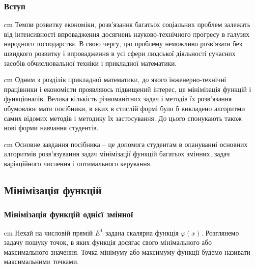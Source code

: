 \documentclass[12pt,a4paper]{article}
\begin{document}
\begin{center}
\section*{Вступ}
\end{center}
\begin{flushleft}
\parbox{14,5 cm}{ cm  Темпи розвитку економіки, розв’язання багатьох соціальних проблем залежать від інтенсивності впровадження досягнень науково-технічного прогресу в галузях народного господарства. В свою чергу, цю проблему неможливо розв’язати без швидкого розвитку і впровадження в усі сфери людської діяльності сучасних засобів обчислювальної техніки і прикладної математики.}
\end{flushleft}
\begin{flushleft}
\parbox{14,5 cm}{ cm  Одним з розділів прикладної математики, до якого інженерно-технічні працівники і економісти проявляюсь підвищений інтерес, це мінімізація функцій і функціоналів. Велика кількість різноманітних задач і методів їх розв’язання обумовлює мати посібники, в яких в стислій формі було б викладено алгоритми самих відомих методів і методику їх застосування. До цього спонукають також нові форми навчання студентів.}
\end{flushleft}
\begin{flushleft}
\parbox{14,5 cm}{ cm  Основне завдання посібника – це допомога студентам в опануванні основних алгоритмів розв’язування задач мінімізації функцій багатьох змінних, задач варіаційного числення і оптимального керування.}
\end{flushleft}
\newpage
\begin{center}
\part{Мінімізація функцій}
\section{Мінімізація функцій однієї змінної}
\end{center}
\begin{flushleft}
\parbox{14,5 cm}{ cm  Нехай на числовій прямій ${E}^1$ задана скалярна функція $\varphi\left(x\right)$. Розглянемо задачу пошуку точок, в яких функція досягає свого мінімального або максимального значення. Точка мінімуму або максимуму функції будемо називати максимальними точками.}
\end{flushleft}
\end{document}
